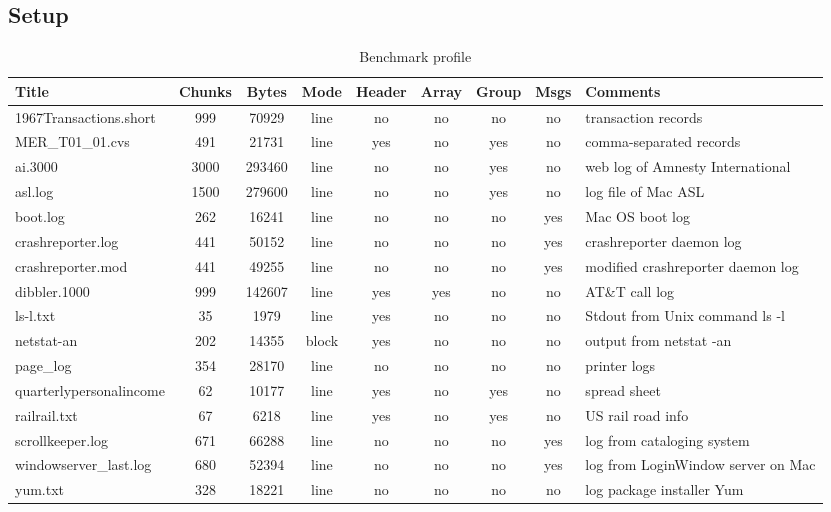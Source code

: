 \subsection{Setup}
\begin{table*}
\begin{center}
\begin{tabular}{|l|c|c|c|c|c|c|c|l|} \hline
Title		& Chunks & Bytes	& Mode  &Header	& Array	& Group & Msgs 	& Comments \\ \hline \hline
1967Transactions.short	& 999	& 70929	& line	& no	& no	& no	& no	& transaction records \\ \hline
MER\_T01\_01.cvs	& 491	& 21731 & line  & yes	& no	& yes	& no	& comma-separated records\\ \hline
ai.3000		& 3000		& 293460 & line	& no	& no	& yes	& no	& web log of Amnesty International \\ \hline
asl.log &	1500	& 279600	& line	& no	& no	& yes	& no	& log file of Mac ASL \\ \hline	
boot.log	& 262	& 16241		& line	& no	& no	& no	& yes	& Mac OS boot log \\ \hline
crashreporter.log	& 441	& 50152 & line	& no	& no	& no	& yes	& crashreporter daemon log \\ \hline
crashreporter.mod & 441	& 49255	& line	& no	& no	& no	& yes	& modified crashreporter daemon log \\ \hline
dibbler.1000	& 999	& 142607 	& line	& yes	& yes	& no	& no	& AT\&T call log \\ \hline
ls-l.txt	& 35	& 1979		& line	& yes	& no	& no	& no	& Stdout from Unix command ls -l \\ \hline
netstat-an	& 202	& 14355		& block	& yes	& no	& no	& no	& output from netstat -an \\ \hline
page\_log	& 354	& 28170		& line	& no	& no	& no	& no	& printer logs \\ \hline
quarterlypersonalincome & 62	& 10177	& line	& yes	& no	& yes	& no	& spread sheet \\ \hline
railrail.txt	& 67	& 6218		& line	& yes	& no	& yes	& no	& US rail road info \\ \hline
scrollkeeper.log & 671	& 66288		& line	& no	& no	& no	& yes	& log from cataloging system \\ \hline
windowserver\_last.log & 680	& 52394	& line	& no	& no	& no	& yes	& log from LoginWindow server on Mac \\ \hline
yum.txt		& 328	& 18221		& line	& no	& no	& no	& no	& log package installer Yum \\ \hline
\end{tabular}
\caption{Benchmark profile}
\end{center}
\end{table*}

